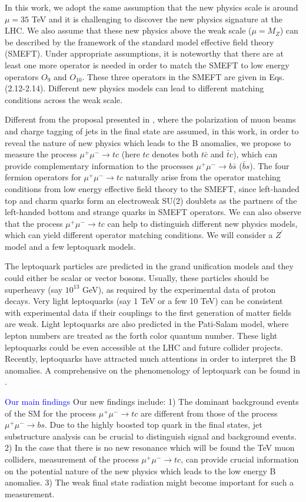 \documentclass[a4paper,11pt]{article}
\begin{document}
In this work, we adopt the same assumption that the new physics scale is around $\mu=35$ TeV and it is challenging to discover the new physics signature at the LHC. We also assume that these new physics above the weak scale ($\mu=M_Z$) can be described by the framework of the standard model effective field theory (SMEFT). Under appropriate assumptions, it is noteworthy that there are at least one more operator is needed in order to match the SMEFT to low energy operators $O_9$ and $O_{10}$. These three operators in the SMEFT are given in Eqs. (2.12-2.14). Different new physics models can lead to different matching conditions across the weak scale.

Different from the proposal presented in \cite{Altmannshofer:2022xri}, where the polarization of muon beams and charge tagging of jets in the final state are assumed, in this work, in order to reveal the nature of new physics which leads to the B anomalies, we propose to measure the process $\mu^+\mu^-\to tc$ (here $tc$ denotes both $t \bar{c}$ and $\bar{t} c$), which can provide complementary information to the processes $\mu^+\mu^-\to b \bar{s}$ ($\bar{b} s$). The four fermion operators for $\mu^+\mu^-\to tc$ naturally arise from the operator matching conditions from low energy effective field theory to the SMEFT, since left-handed top and charm quarks form an electroweak SU(2) doublets as the partners of the left-handed bottom and strange quarks in SMEFT operators. We can also observe that the process $\mu^+\mu^-\to tc$ can help to distinguish different new physics models, which can yield different operator matching conditions. We will consider a $Z^\prime$ model and a few leptoquark models. 

The leptoquark particles are predicted in the grand unification models and they could either be scalar or vector bosons. Usually, these particles should be superheavy (say $10^13$ GeV), as required by the experimental data of proton decays. Very light leptoquarks (say 1 TeV or a few 10 TeV) can be consistent with experimental data if their couplings to the first generation of matter fields are weak. Light leptoquarks are also predicted in the Pati-Salam model, where lepton numbers are treated as the forth color quantum number. These light leptoquarks could be even accessible at the LHC and future collider projects. Recently, leptoquarks have attracted much attentions in order to interpret the B anomalies. A comprehensive on the phenomenology of leptoquark can be found in \cite{Dorsner:2016wpm}.

\textcolor{blue}{Our main findings} Our new findings include: 1)  The dominant background events of the SM for the process $\mu^+\mu^-\to tc$ are different from those of the process $\mu^+\mu^-\to bs$. Due to the highly boosted top quark in the final states, jet substructure analysis can be crucial to distinguish signal and background events. 2) In the case that there is no new resonance which will be found the TeV muon colliders, measurement of the process $\mu^+\mu^-\to tc$, can provide crucial information on the potential nature of the new physics which leads to the low energy B anomalies. 3) The weak final state radiation might become important for such a measurement.
\end{document}
